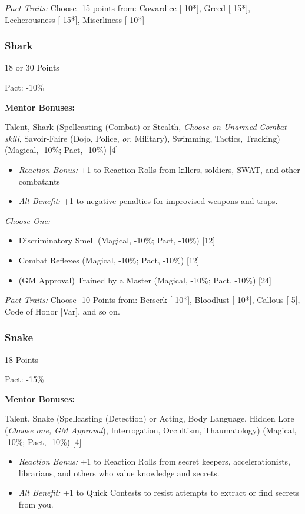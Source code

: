 \begin{multicols}{3}
	\textit{Pact Traits:} Choose -15 points from: Cowardice [-10*], Greed [-15*], Lecherousness [-15*], Miserliness [-10*]
	
	\subsubsection{Shark}
	\begin{flushright}
		18 or 30 Points
	\end{flushright}
	Pact: -10\%
	
	
	\textbf{Mentor Bonuses:} 
	
	Talent, Shark (Spellcasting (Combat) or Stealth, \textit{Choose on Unarmed Combat skill}, Savoir-Faire (Dojo, Police, \textit{or}, Military), Swimming, Tactics, Tracking) (Magical, -10\%; Pact, -10\%) [4]
	\begin{itemize}
		\itemsep 0pt
		\item \textit{Reaction Bonus:} +1 to Reaction Rolls from killers, soldiers, SWAT, and other combatants
		\item \textit{Alt Benefit:} +1 to negative penalties for improvised weapons and traps. %
	\end{itemize}
	
	\textit{Choose One:}
	\begin{itemize}
		\itemsep 0pt
		\item Discriminatory Smell (Magical, -10\%; Pact, -10\%) [12]
		\item Combat Reflexes (Magical, -10\%; Pact, -10\%) [12]
		\item (GM Approval) Trained by a Master (Magical, -10\%; Pact, -10\%) [24]
	\end{itemize}
	
	\textit{Pact Traits:} Choose -10 Points from: Berserk [-10*], Bloodlust [-10*], Callous [-5], Code of Honor [Var], and so on.
	
	\subsubsection{Snake}
	\begin{flushright}
		18 Points
	\end{flushright}
	Pact: -15\%
	
	
	\textbf{Mentor Bonuses:} 
	
	Talent, Snake (Spellcasting (Detection) or Acting, Body Language, Hidden Lore (\textit{Choose one, GM Approval}), Interrogation, Occultism, Thaumatology) (Magical, -10\%; Pact, -10\%) [4]
	\begin{itemize}
		\itemsep 0pt
		\item \textit{Reaction Bonus:} +1 to Reaction Rolls from secret keepers, accelerationists, librarians, and others who value knowledge and secrets.
		\item \textit{Alt Benefit:} +1 to Quick Contests to resist attempts to extract or find secrets from you.
	\end{itemize}
	

\end{multicols}
